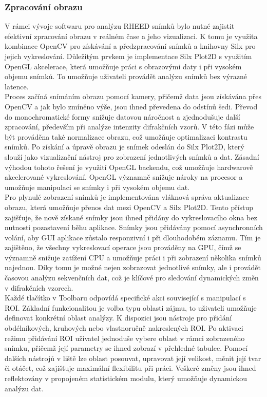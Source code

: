 \documentclass{article}
\begin{document}
\subsubsection{Zpracování obrazu}
V rámci vývoje softwaru pro analýzu RHEED snímků bylo nutné zajistit efektivní zpracování obrazu v reálném čase a jeho vizualizaci. K tomu je využita kombinace OpenCV pro získávání a předzpracování snímků a knihovny Silx pro jejich vykreslování. Důležitým prvkem je implementace Silx Plot2D s využitím OpenGL akcelerace, která umožňuje práci s obrazovými daty i při vysokém objemu snímků. To umožňuje uživateli provádět analýzu snímků bez výrazné latence.\\

Proces začíná snímáním obrazu pomocí kamery, přičemž data jsou získávána přes OpenCV a jak bylo zmíněno výše, jsou ihned převedena do odstínů šedi. Převod do monochromatické formy snižuje datovou náročnost a zjednodušuje další zpracování, především při analýze intenzity difrakčních vzorů. V této fázi může být prováděna také normalizace obrazu, což umožňuje optimalizaci kontrastu snímků. Po získání a úpravě obrazu je snímek odeslán do Silx Plot2D, který slouží jako vizualizační nástroj pro zobrazení jednotlivých snímků a dat. Zásadní výhodou tohoto řešení je využití OpenGL backendu, což umožňuje hardwarově akcelerované vykreslování. OpenGL významně snižuje nároky na procesor a umožňuje manipulaci se snímky i při vysokém objemu dat.\\

Pro plynulé zobrazení snímků je implementována vláknová správa aktualizace obrazu, která umožňuje přenos dat mezi OpenCV a Silx Plot2D. Tento přístup zajišťuje, že nově získané snímky jsou ihned přidány do vykreslovacího okna bez nutnosti pozastavení běhu aplikace. Snímky jsou přidávány pomocí asynchronních volání, aby GUI aplikace zůstalo responzivní i při dlouhodobém záznamu. Tím je zajištěno, že všechny vykreslovací operace jsou prováděny na GPU, čímž se významně snižuje zatížení CPU a umožňuje práci i při zobrazení několika snímků najednou. Díky tomu je možné nejen zobrazovat jednotlivé snímky, ale i provádět časovou analýzu sekvenčních dat, což je klíčové pro sledování dynamických změn v difrakčních vzorech.\\

Každé tlačítko v Toolbaru odpovídá specifické akci související s manipulací s ROI. Základní funkcionalitou je volba typu oblasti zájmu, to uživateli umožňuje definovat konkrétní oblast analýzy. K dispozici jsou nástroje pro přidání obdélníkových, kruhových nebo vlastnoručně nakreslených ROI. Po aktivaci režimu přidávání ROI uživatel jednoduše vybere oblast v rámci zobrazeného snímku, přičemž její parametry se ihned zobrazí v přehledné tabulce. Pomocí dalších nástrojů v liště lze oblast posouvat, upravovat její velikost, měnit její tvar či otáčet, což zajišťuje maximální flexibilitu při práci. Veškeré změny jsou ihned reflektovány v propojeném statistickém modulu, který umožňuje dynamickou analýzu dat.\\
\end{document}
